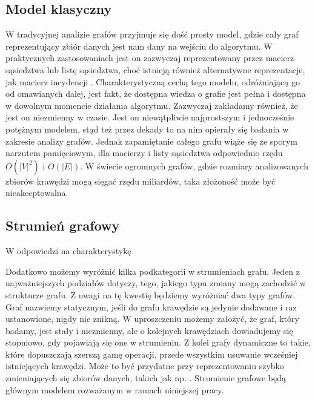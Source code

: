     \subsection{Model klasyczny}
        W tradycyjnej analizie grafów przyjmuje się dość prosty model, gdzie cały graf reprezentujący zbiór danych jest nam dany na wejściu do algorytmu. W praktycznych zastosowaniach jest on zazwyczaj reprezentowany przez macierz sąsiedztwa lub listę sąsiedztwa, choć istnieją również alternatywne reprezentacje, jak macierz incydencji \cite{Wilson_2015}. Charakterystyczną cechą tego modelu, odróżniającą go od omawianych dalej, jest fakt, że dostępna wiedza o grafie jest pełna i dostępna w dowolnym momencie działania algorytmu. Zazwyczaj zakładamy również, że jest on niezmienny w czasie. Jest on niewątpliwie najprostszym i jednocześnie potężnym modelem, stąd też przez dekady to na nim opierały się badania w zakresie analizy grafów. Jednak zapamiętanie całego grafu wiąże się ze sporym narzutem pamięciowym, dla macierzy i listy sąsiedztwa odpowiednio rzędu $O(|V|^2)$ i $O(|E|)$. W świecie ogromnych grafów, gdzie rozmiary analizowanych zbiorów krawędzi mogą sięgać rzędu miliardów, taka złożoność może być nieakceptowalna. 

    \subsection{Strumień grafowy}
        W odpowiedzi na charakterystykę 

        Dodatkowo możemy wyróżnić kilka podkategorii w strumieniach grafu. Jeden z najważniejszych podziałów dotyczy, tego, jakiego typu zmiany mogą zachodzić w strukturze grafu. Z uwagi na tę kwestię będziemy wyróżniać dwa typy grafów. Graf nazwiemy statycznym, jeśli do grafu krawędzie są jedynie dodawane i raz ustanowione, nigdy nie znikną. W uproszczeniu możemy założyć, że graf, który badamy, jest stały i niezmienny, ale o kolejnych krawędziach dowiadujemy się stopniowo, gdy pojawiają się one w strumieniu. Z kolei grafy dynamiczne to takie, które dopuszczają szerszą gamę operacji, przede wszystkim usuwanie wcześniej istniejących krawędzi. Może to być przydatne przy reprezentowaniu szybko zmieniających się zbiorów danych, takich jak np. . Strumienie grafowe będą głównym modelem rozważanym w ramach niniejszej pracy. 

